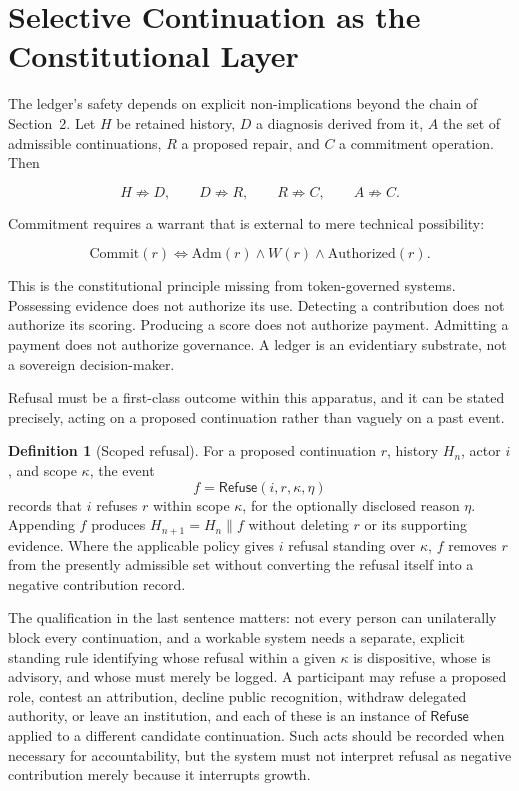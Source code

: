 \documentclass[11pt,oneside]{article}
\theoremstyle{plain}
\theoremstyle{definition}
\newtheorem{definition}{Definition}
\newcommand{\Refuse}{\mathsf{Refuse}}
\begin{document}
\section{Selective Continuation as the Constitutional Layer}

The ledger's safety depends on explicit non-implications beyond the chain of Section~2. Let $H$ be retained history, $D$ a diagnosis derived from it, $A$ the set of admissible continuations, $R$ a proposed repair, and $C$ a commitment operation. Then

\begin{equation}
H \not\Rightarrow D, \qquad D \not\Rightarrow R, \qquad
R \not\Rightarrow C, \qquad A \not\Rightarrow C.
\end{equation}

Commitment requires a warrant that is external to mere technical possibility:

\begin{equation}
\mathrm{Commit}(r) \iff \mathrm{Adm}(r) \land W(r) \land \mathrm{Authorized}(r).
\end{equation}

This is the constitutional principle missing from token-governed systems. Possessing evidence does not authorize its use. Detecting a contribution does not authorize its scoring. Producing a score does not authorize payment. Admitting a payment does not authorize governance. A ledger is an evidentiary substrate, not a sovereign decision-maker.

Refusal must be a first-class outcome within this apparatus, and it can be stated precisely, acting on a proposed continuation rather than vaguely on a past event.

\begin{definition}[Scoped refusal]
For a proposed continuation $r$, history $H_n$, actor $i$, and scope $\kappa$, the event
\begin{equation}
f = \Refuse(i, r, \kappa, \eta)
\end{equation}
records that $i$ refuses $r$ within scope $\kappa$, for the optionally disclosed reason $\eta$. Appending $f$ produces $H_{n+1} = H_n \mathbin{\|} f$ without deleting $r$ or its supporting evidence. Where the applicable policy gives $i$ refusal standing over $\kappa$, $f$ removes $r$ from the presently admissible set without converting the refusal itself into a negative contribution record.
\end{definition}

The qualification in the last sentence matters: not every person can unilaterally block every continuation, and a workable system needs a separate, explicit standing rule identifying whose refusal within a given $\kappa$ is dispositive, whose is advisory, and whose must merely be logged. A participant may refuse a proposed role, contest an attribution, decline public recognition, withdraw delegated authority, or leave an institution, and each of these is an instance of $\Refuse$ applied to a different candidate continuation. Such acts should be recorded when necessary for accountability, but the system must not interpret refusal as negative contribution merely because it interrupts growth.
\end{document}
